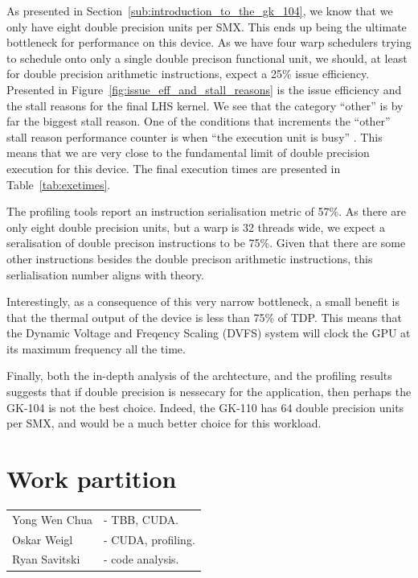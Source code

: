 \documentclass[11pt, oneside, a4paper]{article}
\begin{document}
As presented in Section~\ref{sub:introduction_to_the_gk_104}, we know that we only have eight double precision units per SMX. This ends up being the ultimate bottleneck for performance on this device.
As we have four warp schedulers trying to schedule onto only a single double precison functional unit, we should, at least for double precision arithmetic instructions, expect a 25\% issue efficiency.
Presented in Figure~\ref{fig:issue_eff_and_stall_reasons} is the issue efficiency and the stall reasons for the final LHS kernel.
We see that the category ``other'' is by far the biggest stall reason. One of the conditions that increments the ``other'' stall reason performance counter is when ``the execution unit is busy'' \cite{IssueStallOther}.
This means that we are very close to the fundamental limit of double precision execution for this device.
The final execution times are presented in Table~\ref{tab:exetimes}.

The profiling tools report an instruction serialisation metric of 57\%. As there are only eight double precision units, but a warp is 32 threads wide, we expect a seralisation of double precison instructions to be 75\%. Given that there are some other instructions besides the double precison arithmetic instructions, this serlialisation number aligns with theory.

Interestingly, as a consequence of this very narrow bottleneck, a small benefit is that the thermal output of the device is less than 75\% of TDP. This means that the Dynamic Voltage and Freqency Scaling (DVFS) system will clock the GPU at its maximum frequency all the time.

Finally, both the in-depth analysis of the archtecture, and the profiling results suggests that if double precision is nessecary for the application, then perhaps the GK-104 is not the best choice. Indeed, the GK-110 has 64 double precision units per SMX, and would be a much better choice for this workload.




\section{Work partition} %
\label{sec:work_partition}
\begin{tabular}{ l l  }
Yong Wen Chua & - TBB, CUDA. \\
Oskar Weigl & - CUDA, profiling. \\
Ryan Savitski & - code analysis. \\
\end{tabular}
\end{document}
